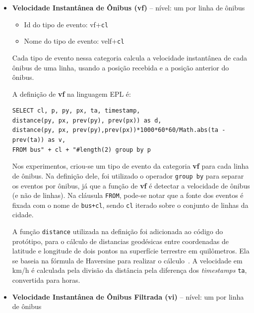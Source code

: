 \begin{itemize}    
    \item \textbf{Velocidade Instantânea de Ônibus (vf)} -- nível: um por linha de ônibus
    \begin{itemize}
        \item  Id do tipo de evento: vf+\texttt{cl}%
        \item Nome do tipo de evento: velf+\texttt{cl}%
    \end{itemize}
   
    
    
    Cada tipo de evento nessa categoria calcula a velocidade instantânea de cada ônibus de uma linha, usando a posição recebida e a posição anterior do ônibus. %
    
    A definição de \textbf{vf} na linguagem EPL é:
\begin{verbatim}
SELECT cl, p, py, px, ta, timestamp, 
distance(py, px, prev(py), prev(px)) as d,
distance(py, px, prev(py),prev(px))*1000*60*60/Math.abs(ta - prev(ta)) as v,
FROM bus" + cl + "#length(2) group by p 
\end{verbatim}

    Nos experimentos, criou-se um tipo de evento da categoria \textbf{vf} para cada linha de ônibus. Na definição dele, foi utilizado o operador \texttt{group by} para separar os eventos por ônibus, já que a função de \textbf{vf} é detectar a velocidade de ônibus (e não de linhas). Na cláusula \texttt{FROM}, pode-se notar que a fonte dos eventos é fixada com o nome de \texttt{bus+cl}, sendo \texttt{cl} iterado sobre o conjunto de linhas da cidade. 
    
    A função \texttt{distance} utilizada na definição foi adicionada ao código do protótipo, para o cálculo de distancias geodésicas entre coordenadas de latitude e longitude de dois pontos na superfície terrestre em quilômetros. Ela se baseia na fórmula de Haversine para realizar o cálculo~\citep{Haversine}. A velocidade em km/h é calculada pela divisão da distância pela diferença dos \textit{timestamps} \texttt{ta}, convertida para horas.
 
    \item \textbf{Velocidade Instantânea de Ônibus Filtrada (vi)}  -- nível: um por linha de ônibus
    

\end{itemize}
